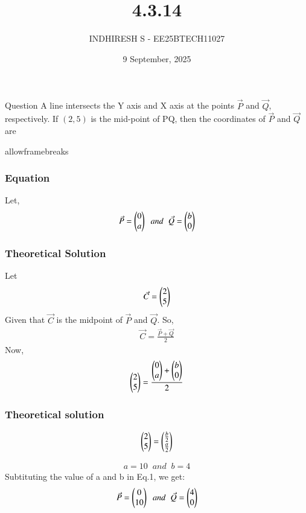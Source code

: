 \documentclass{beamer}
\title %
{4.3.14}
\date{9 September, 2025}
\author %
{INDHIRESH S - EE25BTECH11027}
\begin{document}
\frame{\titlepage}
\begin{frame}{Question}
 A line intersects the Y axis and X axis at the points $\Vec{P}$ and $\vec{Q}$, respectively. If $(2, 5)$ is the mid-point of PQ, then the coordinates of $\Vec{P}$ and $\Vec{Q}$ are
    
\end{frame}
\begin{frame}{allowframebreaks}
\frametitle{Equation}

    \centering
    
    \label{tab:parameters}
Let,
\begin{align}
     \Vec{P}=\begin{pmatrix}0\\a\end{pmatrix}\;\;and\;\;\Vec{Q}=\begin{pmatrix}b\\0\end{pmatrix}
\end{align}
   
\end{frame}


\begin{frame}
\frametitle{Theoretical Solution}
Let
\begin{align}
    \Vec{C}=\begin{pmatrix}2\\5\end{pmatrix}
\end{align}
Given that $\Vec{C}$ is the midpoint of $\Vec{P}$ and $\Vec{Q}$. So,
\begin{align}
    \Vec{C}=\frac{\Vec{P}+\Vec{Q}}{2}
\end{align}
Now,
\begin{align}
\begin{pmatrix}2\\5\end{pmatrix}=\frac{\begin{pmatrix}0\\a\end{pmatrix}+\begin{pmatrix}b\\0\end{pmatrix}}{2}
\end{align}



\end{frame}
\begin{frame}
\frametitle{Theoretical solution}
\begin{align}
    \begin{pmatrix}2\\5\end{pmatrix}=\begin{pmatrix}\frac{b}{2}\\\frac{a}{2}\end{pmatrix}
\end{align}

\begin{align}
    a=10\;\;and\;\;b=4
\end{align}
Subtituting the value of a and b in Eq.1, we get:
\begin{align}
    \Vec{P}=\begin{pmatrix}0\\10\end{pmatrix}\;\;and\;\;\Vec{Q}=\begin{pmatrix}4\\0\end{pmatrix}
\end{align}


\end{frame}
\end{document}
